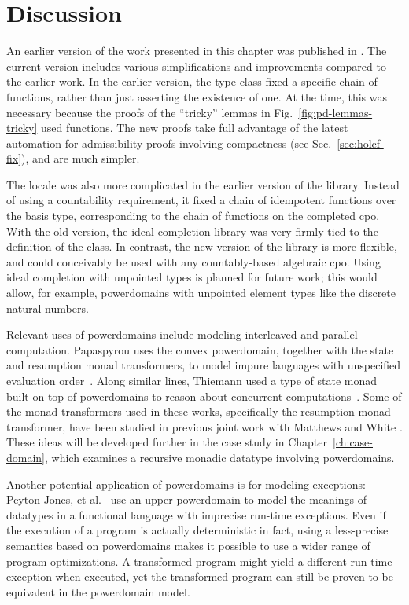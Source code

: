 \section{Discussion}
\label{sec:pd-discussion}

An earlier version of the work presented in this chapter was published in \cite{huffman08powerdomain}. The current version includes various simplifications and improvements compared to the earlier work. In the earlier version, the  type class fixed a specific chain of  functions, rather than just asserting the existence of one. At the time, this was necessary because the proofs of the ``tricky'' lemmas in Fig.~\ref{fig:pd-lemmas-tricky} used  functions. The new proofs take full advantage of the latest automation for admissibility proofs involving compactness (see Sec.~\ref{sec:holcf-fix}), and are much simpler.

The  locale was also more complicated in the earlier version of the library. Instead of using a countability requirement, it fixed a chain of idempotent  functions over the basis type, corresponding to the chain of  functions on the completed cpo. With the old version, the ideal completion library was very firmly tied to the definition of the  class. In contrast, the new version of the library is more flexible, and could conceivably be used with any countably-based algebraic cpo. Using ideal completion with unpointed types is planned for future work; this would allow, for example, powerdomains with unpointed element types like the discrete natural numbers.

Relevant uses of powerdomains include modeling interleaved and parallel computation. Papaspyrou uses the convex powerdomain, together with the state and resumption monad transformers, to model impure languages with unspecified evaluation order~\cite{papaspyrou00study}. Along similar lines, Thiemann used a type of state monad built on top of powerdomains to reason about concurrent computations~\cite{thiemann95towards}. Some of the monad transformers used in these works, specifically the resumption monad transformer, have been studied in previous joint work with Matthews and White \cite{huffman05axiomatic}. These ideas will be developed further in the case study in Chapter~\ref{ch:case-domain}, which examines a recursive monadic datatype involving powerdomains.

Another potential application of powerdomains is for modeling exceptions: Peyton Jones, et al.~\cite{PJ++99} use an upper powerdomain to model the meanings of datatypes in a functional language with imprecise run-time exceptions. Even if the execution of a program is actually deterministic in fact, using a less-precise semantics based on powerdomains makes it possible to use a wider range of program optimizations. A transformed program might yield a different run-time exception when executed, yet the transformed program can still be proven to be equivalent in the powerdomain model.

